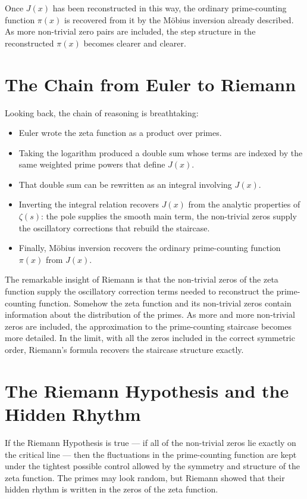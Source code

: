 \documentclass[11pt]{article}
\begin{document}
Once $J(x)$ has been reconstructed in this way, the ordinary prime-counting function $\pi(x)$ is recovered from it by the M\"obius inversion already described. As more non-trivial zero pairs are included, the step structure in the reconstructed $\pi(x)$ becomes clearer and clearer.

\section{The Chain from Euler to Riemann}

Looking back, the chain of reasoning is breathtaking:

\begin{itemize}
\item Euler wrote the zeta function as a product over primes.
\item Taking the logarithm produced a double sum whose terms are indexed by the same weighted prime powers that define $J(x)$.
\item That double sum can be rewritten as an integral involving $J(x)$.
\item Inverting the integral relation recovers $J(x)$ from the analytic properties of $\zeta(s)$: the pole supplies the smooth main term, the non-trivial zeros supply the oscillatory corrections that rebuild the staircase.
\item Finally, M\"obius inversion recovers the ordinary prime-counting function $\pi(x)$ from $J(x)$.
\end{itemize}

The remarkable insight of Riemann is that the non-trivial zeros of the zeta function supply the oscillatory correction terms needed to reconstruct the prime-counting function. Somehow the zeta function and its non-trivial zeros contain information about the distribution of the primes. As more and more non-trivial zeros are included, the approximation to the prime-counting staircase becomes more detailed. In the limit, with all the zeros included in the correct symmetric order, Riemann's formula recovers the staircase structure exactly.

\section{The Riemann Hypothesis and the Hidden Rhythm}

If the Riemann Hypothesis is true --- if all of the non-trivial zeros lie exactly on the critical line --- then the fluctuations in the prime-counting function are kept under the tightest possible control allowed by the symmetry and structure of the zeta function. The primes may look random, but Riemann showed that their hidden rhythm is written in the zeros of the zeta function.
\end{document}
